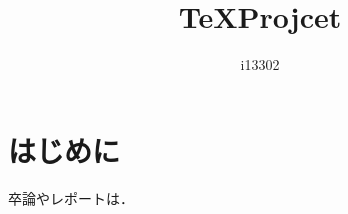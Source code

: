 \documentclass[10pt]{jarticle}
\title{\TeX Projcet}
\author{i13302}
\begin{document}
 
\maketitle 
\section{はじめに}
卒論やレポートは．
\end{document}
